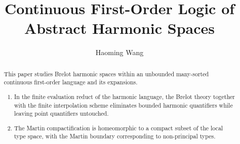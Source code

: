 \documentclass{amsart}
\theoremstyle{definition}
\theoremstyle{remark}
\numberwithin{equation}{section}
\begin{document}
	
	\author[Haoming Wang]{Haoming Wang}
	\title{Continuous First-Order Logic of Abstract Harmonic Spaces}
	\address{Center for Combinatorics, Nankai University, Tientsin 300071, China}
	
	
	\begin{abstract}
		This paper studies Brelot harmonic spaces within an unbounded
		many-sorted continuous first-order language and its expansions.
		
		\begin{enumerate}
			\item In the finite evaluation reduct of the harmonic language, the Brelot theory together with the finite interpolation scheme eliminates bounded harmonic quantifiers while leaving point quantifiers untouched. 
			
			\item The Martin compactification is homeomorphic to a compact subset of the local type space, with the Martin boundary corresponding to non-principal types. 
			

\end{enumerate}
\end{abstract}
\end{document}
